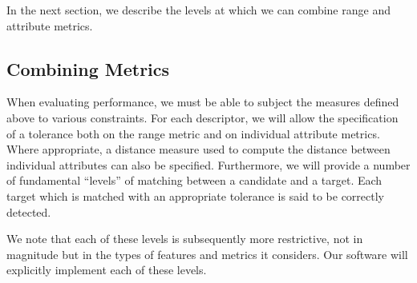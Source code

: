 In the next section, we describe the levels at which we can combine
range and attribute metrics.


\subsection{Combining Metrics}

When evaluating performance, we must be able to subject the
measures defined above to various constraints.  For each descriptor,
we will allow the specification of a tolerance both on the range
metric and on individual attribute metrics. Where appropriate, a
distance measure used to compute the distance between individual
attributes can also be specified.  Furthermore, we will provide a
number of fundamental ``levels'' of matching between a candidate and a
target.  Each target which is matched with an appropriate tolerance
is said to be correctly detected.

We note that each of these levels is subsequently more restrictive,
not in magnitude but in the types of features and metrics it
considers.  Our software will explicitly implement each of these
levels.

